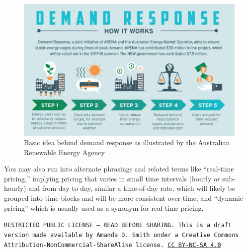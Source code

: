 \documentclass[10pt]{article}
\begin{document}
            
                        \begin{figure}[h]
            \centering
            \includegraphics[width=16cm]{extras29/demand-response.jpg}
            \caption{Basic idea behind demand response as illustrated by the Australian Renewable Energy Agency \cite{Arena_undated-cl}}
            \label{a-d-r}
            \end{figure}



You may also run into alternate phrasings and related terms like ``real-time pricing,'' implying pricing that varies in small time intervals (hourly or sub-hourly) and from day to day, similar a time-of-day rate, which will likely be grouped into time blocks and will be more consistent over time, and ``dynamic pricing'' which is usually used as a synonym for real-time pricing.





\bigskip

\noindent
\texttt{\footnotesize RESTRICTED PUBLIC LICENSE --- READ BEFORE SHARING. This is a draft version made available by Amanda D. Smith under a Creative Commons Attribution-NonCommercial-ShareAlike license. 
\href{https://creativecommons.org/licenses/by-nc-sa/4.0/}{CC BY-NC-SA 4.0}}

\medskip

\newpage
\printbibliography
\end{document}
